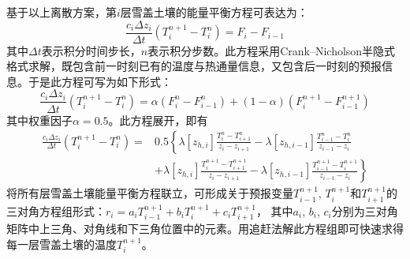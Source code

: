 基于以上离散方案，第$i$层雪盖土壤的能量平衡方程可表达为：
\begin{equation}
\frac{c_{i} \Delta z_{i}}{\Delta t}\left(T_{i}^{n+1}-T_{i}^{n}\right)=F_{i}-F_{i-1}
\end{equation}
%
其中$\Delta t$表示积分时间步长，$n$表示积分步数。此方程采用Crank--Nicholson半隐式格式求解，既包含前一时刻已有的温度与热通量信息，又包含后一时刻的预报信息。于是此方程可写为如下形式：
\begin{equation}
\frac{c_{i} \Delta z_{i}}{\Delta t}\left(T_{i}^{n+1}-T_{i}^{n}\right)=\alpha\left(F_{i}^{n}-F_{i-1}^{n}\right)+(1-\alpha)\left(F_{i}^{n+1}-F_{i-1}^{n+1}\right)
\end{equation}
其中权重因子$\alpha=0.5$。此方程展开，即有
\begin{equation}
\begin{aligned} \frac{c_{i} \Delta z_{i}}{\Delta t}\left(T_{i}^{n+1}-T_{i}^{n}\right)=& 0.5\left\{\lambda\left[z_{h, i}\right] \frac{T_{i}^{n}-T_{i+1}^{n}}{z_{i}-z_{i+1}}-\lambda\left[z_{h, i-1}\right] \frac{T_{i-1}^{n}-T_{i}^{n}}{z_{i-1}-z_{i}}\right.\\ &\left.+\lambda\left[z_{h, i}\right] \frac{T_{i}^{n+1}-T_{i+1}^{n+1}}{z_{i}-z_{i+1}}-\lambda\left[z_{h, i-1}\right] \frac{T_{i-1}^{n+1}-T_{i}^{n+1}}{z_{i-1}-z_{i}}\right\} \end{aligned}
\end{equation}
将所有层雪盖土壤能量平衡方程联立，可形成关于预报变量$T_{i-1}^{n+1}$, $T_i^{n+1}$和$T_{i+1}^{n+1}$的三对角方程组形式：$r_i=a_iT_{i-1}^{n+1}+b_iT_i^{n+1}+c_iT_{i+1}^{n+1}$，
其中$a_i$, $b_i$, $c_i$分别为三对角矩阵中上三角、对角线和下三角位置中的元素。用追赶法解此方程组即可快速求得每一层雪盖土壤的温度$T_i^{n+1}$。


